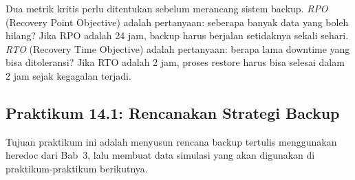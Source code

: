 Dua metrik kritis perlu ditentukan sebelum merancang sistem backup. \emph{RPO}
(Recovery Point Objective) adalah pertanyaan: seberapa banyak data yang boleh
hilang? Jika RPO adalah 24 jam, backup harus berjalan setidaknya sekali sehari.
\emph{RTO} (Recovery Time Objective) adalah pertanyaan: berapa lama downtime
yang bisa ditoleransi? Jika RTO adalah 2 jam, proses restore harus bisa selesai
dalam 2 jam sejak kegagalan terjadi.

\subsection*{Praktikum 14.1: Rencanakan Strategi Backup}

Tujuan praktikum ini adalah menyusun rencana backup tertulis menggunakan heredoc
dari Bab~3, lalu membuat data simulasi yang akan digunakan di praktikum-praktikum
berikutnya.

